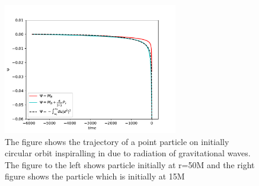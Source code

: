 \documentclass[prd,preprintnumbers,onecolumn,eqsecnum,floatfix,letter]{revtex4}
\begin{document}
\begin{figure}
	\includegraphics[width=3.0in]{../plots/Psi2EOBHamiltonia_BOB.pdf}
	\caption{The figure shows the trajectory of a point particle on initially circular orbit inspiralling in due to radiation of gravitational waves. The figure to the left shows particle initially at r=50M and the right figure shows the particle which is initially at 15M}
	\label{fig:BoBFig}
\end{figure} 
\end{document}
